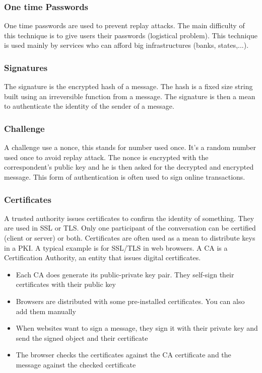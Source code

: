 \subsubsection{One time Passwords}
One time passwords are used to prevent replay attacks.
The main difficulty of this technique is to give users their passwords
(logistical problem).
This technique is used mainly by services who can afford big infrastructures
(banks, states,...).

\subsubsection{Signatures}
The signature is the encrypted hash of a message.
The hash is a fixed size string built using an irreversible function from a
message.
The signature is then a mean to authenticate the identity of the sender of a
message.

\subsubsection{Challenge}
A challenge use a nonce, this stands for number used once.
It's a random number used once to avoid replay attack.
The nonce is encrypted with the correspondent's public key and he is then
asked for the decrypted and encrypted message.
This form of authentication is often used to sign online transactions.

\subsubsection{Certificates}
A trusted authority issues certificates to confirm the identity of something.
They are used in SSL or TLS.
Only one participant of the conversation can be certified (client or server)
or both.
Certificates are often used as a mean to distribute keys in a PKI. A typical
example is for SSL/TLS in web browsers. A CA is a Certification Authority, an
entity that issues digital certificates.
\begin{itemize}
\item Each CA does generate its public-private key pair. They self-sign their
certificates with their public key
\item Browsers are distributed with some pre-installed certificates. You can
also add them manually
\item When websites want to sign a message, they sign it with their private
key and send the signed object and their certificate
\item The browser checks the certificates against the CA certificate and the
message against the checked certificate
\end{itemize}

